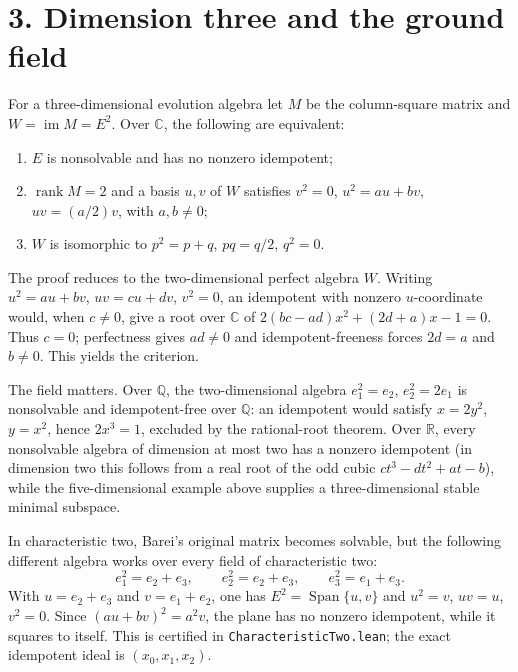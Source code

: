 \documentclass[11pt]{article}
\newcommand{\Span}{\operatorname{Span}}
\newcommand{\im}{\operatorname{im}}
\begin{document}
\section*{3. Dimension three and the ground field}
For a three-dimensional evolution algebra let $M$ be the column-square
matrix and $W=\im M=E^2$.  Over $\mathbb C$, the following are equivalent:
\begin{enumerate}
\item $E$ is nonsolvable and has no nonzero idempotent;
\item $\operatorname{rank}M=2$ and a basis $u,v$ of $W$ satisfies
 $v^2=0$, $u^2=au+bv$, $uv=(a/2)v$, with $a,b\ne0$;
\item $W$ is isomorphic to $p^2=p+q$, $pq=q/2$, $q^2=0$.
\end{enumerate}
The proof reduces to the two-dimensional perfect algebra $W$.  Writing
$u^2=au+bv$, $uv=cu+dv$, $v^2=0$, an idempotent with nonzero $u$-coordinate
would, when $c\ne0$, give a root over $\mathbb C$ of
$2(bc-ad)x^2+(2d+a)x-1=0$.  Thus $c=0$; perfectness gives $ad\ne0$ and
idempotent-freeness forces $2d=a$ and $b\ne0$.  This yields the criterion.

The field matters.  Over $\mathbb Q$, the two-dimensional algebra
$e_1^2=e_2$, $e_2^2=2e_1$ is nonsolvable and idempotent-free over $\mathbb Q$:
an idempotent would satisfy $x=2y^2$, $y=x^2$, hence $2x^3=1$, excluded by
the rational-root theorem.  Over $\mathbb R$, every nonsolvable algebra of
dimension at most two has a nonzero idempotent (in dimension two this follows
from a real root of the odd cubic $ct^3-dt^2+at-b$), while the five-dimensional
example above supplies a three-dimensional stable minimal subspace.

In characteristic two, Barei's original matrix becomes solvable, but the
following different algebra works over every field of characteristic two:
\[
 e_1^2=e_2+e_3,\qquad e_2^2=e_2+e_3,\qquad e_3^2=e_1+e_3.
\]
With $u=e_2+e_3$ and $v=e_1+e_2$, one has $E^2=\Span\{u,v\}$ and
$u^2=v$, $uv=u$, $v^2=0$.  Since $(au+bv)^2=a^2v$, the plane has no nonzero
idempotent, while it squares to itself.  This is certified in
\texttt{CharacteristicTwo.lean}; the exact idempotent ideal is $(x_0,x_1,x_2)$.
\end{document}
